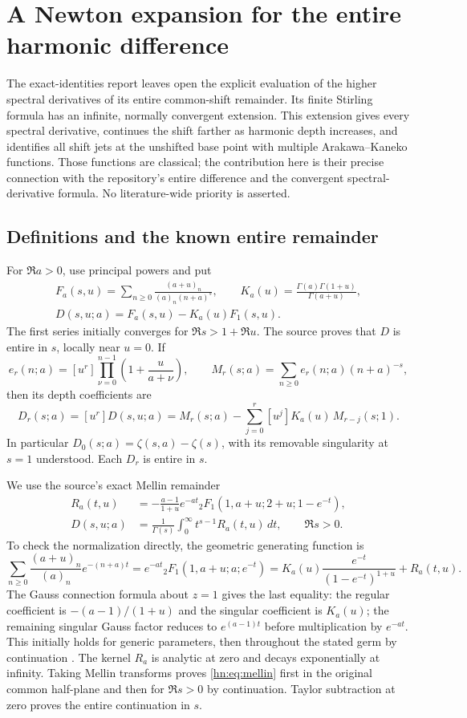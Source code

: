 \section{A Newton expansion for the entire harmonic difference}
\label{hn:sec:newton}

The exact-identities report \cite{RepoExact} leaves open the explicit evaluation of the
higher spectral derivatives of its entire common-shift remainder.
Its finite Stirling formula has an infinite, normally convergent
extension. This extension gives every spectral derivative, continues
the shift farther as harmonic depth increases, and identifies all shift
jets at the unshifted base point with multiple Arakawa--Kaneko functions.
Those functions are classical; the contribution here is their precise
connection with the repository's entire difference and the convergent
spectral-derivative formula. No literature-wide priority is asserted.

\subsection{Definitions and the known entire remainder}

For $\Re a>0$, use principal powers and put
\[
 \begin{gathered}
 F_a(s,u)=\sum_{n\ge0}\frac{(a+u)_n}{(a)_n(n+a)^s},\qquad
 K_a(u)=\frac{\Gamma(a)\Gamma(1+u)}{\Gamma(a+u)},\\[3pt]
 D(s,u;a)=F_a(s,u)-K_a(u)F_1(s,u).
 \end{gathered}
\]
The first series initially converges for $\Re s>1+\Re u$.
The source proves that $D$ is entire in $s$, locally near $u=0$.
If
\[
 e_r(n;a)=[u^r]\prod_{\nu=0}^{n-1}\left(1+\frac{u}{a+\nu}\right),
 \qquad M_r(s;a)=\sum_{n\ge0}e_r(n;a)(n+a)^{-s},
\]
then its depth coefficients are
\[
 D_r(s;a)=[u^r]D(s,u;a)
 =M_r(s;a)-\sum_{j=0}^r[u^j]K_a(u)\,M_{r-j}(s;1).
\]
In particular $D_0(s;a)=\zeta(s,a)-\zeta(s)$, with its removable
singularity at $s=1$ understood. Each $D_r$ is entire in $s$.

We use the source's exact Mellin remainder
\begin{align}
 R_a(t,u)
 &=-\frac{a-1}{1+u}e^{-at}
       {}_2F_1(1,a+u;2+u;1-e^{-t}),\label{hn:eq:R}\\
 D(s,u;a)&=\frac1{\Gamma(s)}\int_0^\infty
                         t^{s-1}R_a(t,u)\,dt,\qquad \Re s>0.
 \label{hn:eq:mellin}
\end{align}
To check the normalization directly, the geometric generating function is
\[
 \sum_{n\ge0}\frac{(a+u)_n}{(a)_n}e^{-(n+a)t}
 =e^{-at}{}_2F_1(1,a+u;a;e^{-t})
 =K_a(u)\frac{e^{-t}}{(1-e^{-t})^{1+u}}+R_a(t,u).
\]
The Gauss connection formula about $z=1$ gives the last equality:
the regular coefficient is $-(a-1)/(1+u)$ and the singular
coefficient is $K_a(u)$; the remaining singular Gauss factor reduces
to $e^{(a-1)t}$ before multiplication by $e^{-at}$.
This initially holds for generic parameters, then throughout the
stated germ by continuation \cite{DLMFHypergeom}.
The kernel $R_a$ is analytic at zero and decays exponentially at infinity.
Taking Mellin transforms proves \eqref{hn:eq:mellin} first in the
original common half-plane and then for $\Re s>0$ by continuation. Taylor subtraction at
zero proves the entire continuation in $s$.

